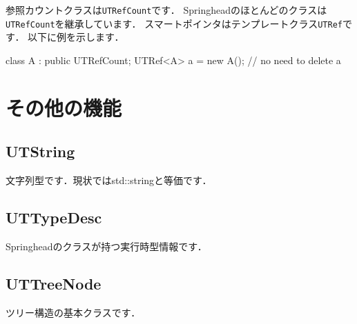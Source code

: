 \KLUDGE 参照カウントクラスは\texttt{UTRefCount}です．
Springheadのほとんどのクラスは\texttt{UTRefCount}を継承しています．
\KLUDGE スマートポインタはテンプレートクラス\texttt{UTRef}です．
\KLUDGE 以下に例を示します．

\begin{sourcecode}
class A : public UTRefCount{};
UTRef<A> a = new A();
// no need to delete a
\end{sourcecode}

\section{その他の機能}

\subsection*{UTString}

\KLUDGE 文字列型です．現状ではstd::stringと等価です．

\subsection*{UTTypeDesc}

Springheadのクラスが持つ実行時型情報です．

\subsection*{UTTreeNode}

\KLUDGE ツリー構造の基本クラスです．

